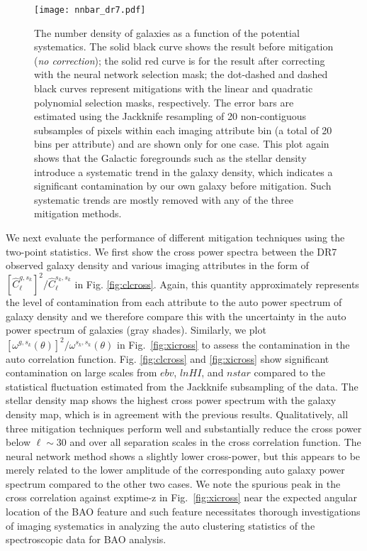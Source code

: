 \documentclass[fleqn, usenatbib]{mnras}
\begin{document}
\begin{figure*}
\centering
\texttt{[image: nnbar\_dr7.pdf]}
\caption{The number density of galaxies as a function of the potential systematics. The solid black curve shows the result before mitigation (\textit{no correction}); the solid red curve is for the result after correcting with the neural network selection mask; the dot-dashed and dashed black curves represent mitigations with the linear and quadratic polynomial selection masks, respectively. The error bars are estimated using the Jackknife resampling of 20 non-contiguous subsamples of pixels within each imaging attribute bin (a total of 20 bins per attribute) and are shown only for one case. This plot again shows that the Galactic foregrounds such as the stellar density introduce a systematic trend in the galaxy density, which indicates a significant contamination by our own galaxy before mitigation. Such systematic trends are mostly removed with any of the three mitigation methods. \label{fig:nnbar}}
\end{figure*}



We next evaluate the performance of different mitigation techniques using the two-point statistics. We first show the cross power spectra between the DR7 observed galaxy density and various imaging attributes in the form of  $[\hat{C}^{g,s_k}_{\ell}]^2/\hat{C}^{s_k,s_k}_{\ell}$ in Fig. \ref{fig:clcross}. Again, this quantity approximately represents the level of contamination from each attribute to the auto power spectrum of galaxy density and we therefore compare this with the uncertainty in the auto power spectrum of galaxies (gray shades). Similarly, we plot $[\omega^{g,s_k}(\theta)]^2/\omega^{s_k,s_k}(\theta)$ in Fig.~\ref{fig:xicross} to assess the contamination in the auto correlation function. Fig. \ref{fig:clcross} and \ref{fig:xicross} show significant contamination on large scales from $ebv$, $lnHI$, and $nstar$ compared to the statistical fluctuation estimated from the Jackknife subsampling of the data. The stellar density map shows the highest cross power spectrum with the galaxy density map, which is in agreement with the previous results. Qualitatively, all three mitigation techniques perform well and substantially reduce the cross power below $\ell \sim 30$ and over all separation scales in the cross correlation function. The neural network method shows a slightly lower cross-power, but this appears to be merely related to the lower amplitude of the corresponding auto galaxy power spectrum compared to the other two cases. We note the spurious peak in the cross correlation against exptime-z in Fig.~\ref{fig:xicross} near the expected angular location of the BAO feature and such feature necessitates thorough investigations of imaging systematics in analyzing the auto clustering statistics of the spectroscopic data for BAO analysis.\\
\end{document}
